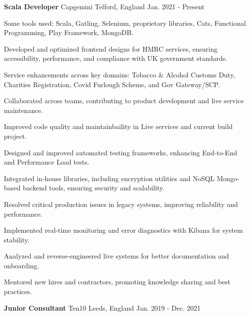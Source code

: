 
\begin{cventries}

  \cventry
    {\textbf{Scala Developer}} %
    {Capgemini} 
    {Telford, England} 
    {Jan. 2021 - Present} 
    {
      \begin{sloppypar}  %
      \begin{cvitems}
        \item {Some tools used: Scala, Gatling, Selenium, proprietary libraries, Cats, Functional Programming, Play Framework, MongoDB.}
        \item {Developed and optimized frontend designs for HMRC services, ensuring accessibility, performance, and compliance with UK government standards.}
        \item {Service enhancements across key domains: Tobacco \& Alcohol Customs Duty, Charities Registration, Covid Furlough Scheme, and Gov Gateway/SCP.}
        \item {Collaborated across teams, contributing to product development and live service maintenance.}
        \item {Improved code quality and maintainbaility in Live services and current build project.}
        \item {Designed and improved automated testing frameworks, enhancing End-to-End and Performance Load tests.}
        \item {Integrated in-house libraries, including encryption utilities and NoSQL Mongo-based backend tools, ensuring security and scalability.}
        \item {Resolved critical production issues in legacy systems, improving reliability and performance.}
        \item {Implemented real-time monitoring and error diagnostics with Kibana for system stability.}
        \item {Analyzed and reverse-engineered live systems for better documentation and onboarding.}
        \item {Mentored new hires and contractors, promoting knowledge sharing and best practices.}
      \end{cvitems}
      \end{sloppypar}
    }
    \cventry
    {\textbf{Junior Consultant}} 
    {Ten10} 
    {Leeds, England} 
    {Jan. 2019 - Dec. 2021}
    {
}
\end{cventries}
